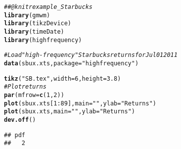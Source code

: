 \documentclass{article}\usepackage[]{graphicx}\usepackage[]{color}
\makeatletter
\newcommand{\hlnum}[1]{\textcolor[rgb]{0.686,0.059,0.569}{#1}}%
\newcommand{\hlstr}[1]{\textcolor[rgb]{0.192,0.494,0.8}{#1}}%
\newcommand{\hlcom}[1]{\textcolor[rgb]{0.678,0.584,0.686}{\textit{#1}}}%
\newcommand{\hlopt}[1]{\textcolor[rgb]{0,0,0}{#1}}%
\newcommand{\hlstd}[1]{\textcolor[rgb]{0.345,0.345,0.345}{#1}}%
\newcommand{\hlkwc}[1]{\textcolor[rgb]{0.333,0.667,0.333}{#1}}%
\newcommand{\hlkwd}[1]{\textcolor[rgb]{0.737,0.353,0.396}{\textbf{#1}}}%
\newenvironment{kframe}{%
 \def\at@end@of@kframe{}%
 \ifinner\ifhmode%
  \def\at@end@of@kframe{\end{minipage}}%
  \begin{minipage}{\columnwidth}%
 \fi\fi%
 \def\FrameCommand##1{\hskip\@totalleftmargin \hskip-\fboxsep
 \colorbox{shadecolor}{##1}\hskip-\fboxsep
     \hskip-\linewidth \hskip-\@totalleftmargin \hskip\columnwidth}%
 \MakeFramed {\advance\hsize-\width
   \@totalleftmargin\z@ \linewidth\hsize
   \@setminipage}}%
 {\par\unskip\endMakeFramed%
 \at@end@of@kframe}
\newenvironment{knitrout}{}{} %
\makeatother
\begin{document}
\begin{knitrout}
\color{fgcolor}\begin{kframe}
\begin{alltt}
\hlcom{## @knitr example_Starbucks}
\hlkwd{library}\hlstd{(gmwm)}
\hlkwd{library}\hlstd{(tikzDevice)}
\hlkwd{library}\hlstd{(timeDate)}
\hlkwd{library}\hlstd{(highfrequency)}
\end{alltt}


{\ttfamily\noindent\itshape\color{messagecolor}{\#\# Loading required package: xts}}

{\ttfamily\noindent\itshape\color{messagecolor}{\#\# Loading required package: zoo}}

{\ttfamily\noindent\itshape\color{messagecolor}{\#\# \\\#\# Attaching package: 'zoo'}}

{\ttfamily\noindent\itshape\color{messagecolor}{\#\# The following objects are masked from 'package:base':\\\#\# \\\#\#\ \ \ \  as.Date, as.Date.numeric}}\begin{alltt}
\hlcom{# Load "high-frequency" Starbucks returns for Jul 01 2011}
\hlkwd{data}\hlstd{(sbux.xts,} \hlkwc{package} \hlstd{=} \hlstr{"highfrequency"}\hlstd{)}

\hlkwd{tikz}\hlstd{(}\hlstr{"SB.tex"}\hlstd{,} \hlkwc{width} \hlstd{=} \hlnum{6}\hlstd{,} \hlkwc{height} \hlstd{=} \hlnum{3.8}\hlstd{)}
\hlcom{# Plot returns}
\hlkwd{par}\hlstd{(}\hlkwc{mfrow} \hlstd{=} \hlkwd{c}\hlstd{(}\hlnum{1}\hlstd{,}\hlnum{2}\hlstd{))}
\hlkwd{plot}\hlstd{(sbux.xts[}\hlnum{1}\hlopt{:}\hlnum{89}\hlstd{],} \hlkwc{main} \hlstd{=} \hlstr{" "}\hlstd{,} \hlkwc{ylab} \hlstd{=} \hlstr{"Returns"}\hlstd{)}
\hlkwd{plot}\hlstd{(sbux.xts,} \hlkwc{main} \hlstd{=} \hlstr{" "}\hlstd{,} \hlkwc{ylab} \hlstd{=} \hlstr{"Returns"}\hlstd{)}
\hlkwd{dev.off}\hlstd{()}
\end{alltt}
\begin{verbatim}
## pdf 
##   2
\end{verbatim}
\end{kframe}
\end{knitrout}
\end{document}
